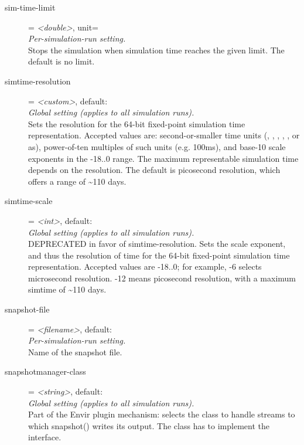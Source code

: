 \begin{description}
\item[sim-time-limit] = \textit{<double>}, unit=\\
    \textit{Per-simulation-run setting.}\\
    Stops the simulation when simulation time reaches the given limit. The
    default is no limit.
\item[simtime-resolution] = \textit{<custom>}, default: \\
    \textit{Global setting (applies to all simulation runs).}\\
    Sets the resolution for the 64-bit fixed-point simulation time
    representation. Accepted values are: second-or-smaller time units (,
    , , , ,  or as), power-of-ten
    multiples of such units (e.g. 100ms), and base-10 scale exponents in the
    -18..0 range. The maximum representable simulation time depends on the
    resolution. The default is picosecond resolution, which offers a range of
    {\textasciitilde}110 days.
\item[simtime-scale] = \textit{<int>}, default: \\
    \textit{Global setting (applies to all simulation runs).}\\
    DEPRECATED in favor of simtime-resolution. Sets the scale exponent, and
    thus the resolution of time for the 64-bit fixed-point simulation time
    representation. Accepted values are -18..0; for example, -6 selects
    microsecond resolution. -12 means picosecond resolution, with a maximum
    simtime of {\textasciitilde}110 days.
\item[snapshot-file] = \textit{<filename>}, default: \\
    \textit{Per-simulation-run setting.}\\
    Name of the snapshot file.
\item[snapshotmanager-class] = \textit{<string>}, default: \\
    \textit{Global setting (applies to all simulation runs).}\\
    Part of the Envir plugin mechanism: selects the class to handle streams to
    which snapshot() writes its output. The class has to implement the
     interface.

\end{description}
